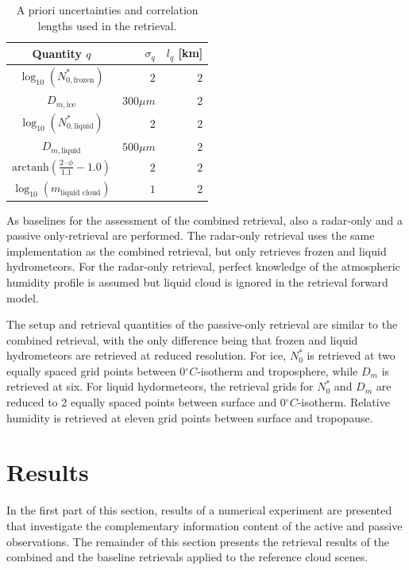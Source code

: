 \documentclass[journal abbreviation, manuscript]{copernicus}
\begin{document}
\begin{table}[h!]
\caption{A priori uncertainties and correlation
 lengths used in the retrieval.}
 \centering
\label{tab:a_priori}
    \begin{tabular}{c|r|r}
     Quantity $q$ & $\sigma_q$ & $l_q$ [km]\\
    \hline
    $\log_{10}(N_{0, \text{frozen}}^*)$    & $2$                       & $2$ \\
    $D_{m, \text{ice}}$               & $300\unit{\mu m}$ & $2$ \\
    $\log_{10}(N_{0, \text{liquid}}^*)$    & $2                      $ & $2$ \\
    $D_{m, \text{liquid}}$            & $500\unit{\mu m}$ & $2$ \\
    $\text{arctanh}(\frac{2 \cdot \phi}{1.1} - 1.0)$ & $2$                       & $2$ \\
    $\log_{10}(m_\text{liquid cloud}) $ & $1$                       & $2$ \\
    \end{tabular}
\end{table}

As baselines for the assessment of the combined retrieval, also a radar-only and
a passive only-retrieval are performed. The radar-only retrieval uses the same
implementation as the combined retrieval, but only retrieves frozen and liquid
hydrometeors. For the radar-only retrieval, perfect knowledge of the atmospheric
humidity profile is assumed but liquid cloud is ignored in the retrieval forward
model.

The setup and retrieval quantities of the passive-only retrieval are similar to
the combined retrieval, with the only difference being that frozen and liquid
hydrometeors are retrieved at reduced resolution. For ice, $N_0^*$ is retrieved
at two equally spaced grid points between $0\unit{^\circ C}$-isotherm and
troposphere, while $D_m$ is retrieved at six. For liquid hydormeteors, the
retrieval grids for $N_0^*$ and $D_m$ are reduced to 2 equally spaced points
between surface and $0\unit{^\circ C}$-isotherm. Relative humidity is retrieved
at eleven grid points between surface and tropopause.

\section{Results}
\label{sec:results}

In the first part of this section, results of a numerical experiment are
presented that investigate the complementary information content of the active
and passive observations. The remainder of this section presents  the retrieval results
of the combined and the baseline retrievals applied to the reference cloud scenes.
\end{document}
